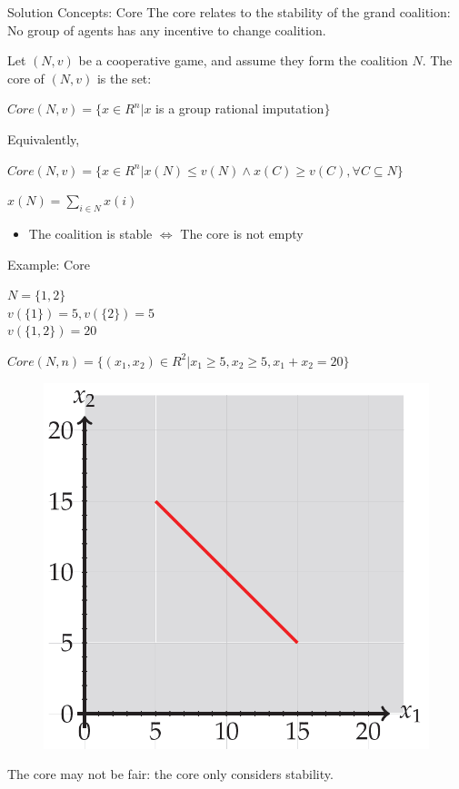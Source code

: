 \documentclass{beamer}
\begin{document}
\begin{frame} {Solution Concepts: Core}
    The core relates to the stability of the grand coalition: \\ No group of agents has any incentive to change coalition.
    \begin{definition}\label{dfn:core}
        Let $(N,v)$ be a cooperative game, and assume they form the coalition $N$. The core of $(N,v)$ is the set:
        \vspace{0.1cm}
        \begin{center}
            $Core(N,v) = \{x \in R^n | x$ is a group rational imputation$\}$
        \end{center}
        Equivalently,
        \vspace{0.1cm}
        \begin{center}
            $Core(N,v) = \{x \in R^n | x(N) \leq v(N) \wedge x(C) \geq v(C), \forall C \subseteq N\}$ \\
        \end{center}
        \small{$x(N) = \sum_{i \in N} x(i)$}
    \end{definition}

    \begin{itemize}
       \item The coalition is stable $\Leftrightarrow$ The core is not empty
    \end{itemize}

\end{frame}
\begin{frame} {Example: Core}

    \begin{center}
      $N = \{1,2\}$ \\
      $v(\{1\}) = 5, v(\{2\}) = 5$ \\
      $v(\{1,2\}) = 20$ \\
    \end{center}

    $Core(N,n) = \{(x_1,x_2) \in R^2 | x_1 \geq 5, x_2 \geq 5, x_1 + x_2 = 20\}$

    \begin{figure}[htbp]
        \centering
        \includegraphics[width=0.3 \columnwidth]{figures/coreex1.png}
    \end{figure}

    The core may not be fair: the core only considers stability.

\end{frame}
\end{document}
